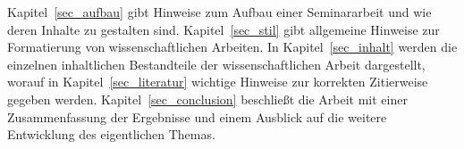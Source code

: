 \bigskip

Kapitel~\ref{sec_aufbau} gibt Hinweise zum Aufbau einer Seminararbeit und wie deren Inhalte zu gestalten sind.
Kapitel~\ref{sec_stil} gibt allgemeine Hinweise zur Formatierung von wissenschaftlichen Arbeiten.
In Kapitel~\ref{sec_inhalt} werden die einzelnen inhaltlichen Bestandteile der wissenschaftlichen Arbeit dargestellt, worauf in Kapitel~\ref{sec_literatur} wichtige Hinweise zur korrekten Zitierweise gegeben werden.
Kapitel~\ref{sec_conclusion} beschließt die Arbeit mit einer Zusammenfassung der Ergebnisse und einem Ausblick auf die weitere Entwicklung des eigentlichen Themas.


